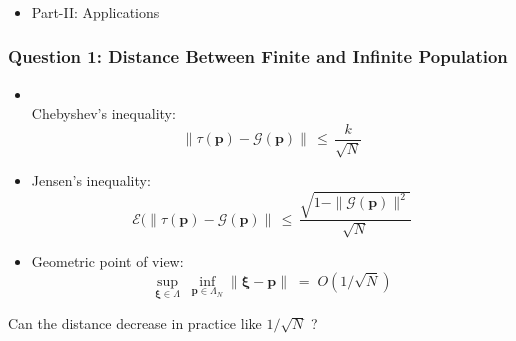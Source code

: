 \documentclass[aspectratio=169]{beamer}
\begin{document}
  \begin{frame}
    \frametitle{}
    \begin{itemize}
      \item Part-II: Applications
      \end{itemize}
  \end{frame}
  
   \begin{frame}
    \frametitle{Question 1: Distance Between Finite and Infinite Population}
    \begin{itemize}
      \item{\mbox{}\\[-0.5 in] 
      Chebyshev's inequality: \[ \| \tau (\bm{p}) - \mathcal{G}(\bm{p}) \| \,\leq\, \frac{k}{\sqrt{N}} \] }
      \item{Jensen's inequality: 
       \[ \mathcal{E}(\| \tau (\bm{p}) - \mathcal{G}(\bm{p}) \| \,\leq\, \frac{\sqrt{1 - \|\mathcal{G}(\bm{p})\|^2}}{\sqrt{N}}\]}
      \item{Geometric point of view: \[ \sup_{\bm{\xi} \in \Lambda} \; \inf_{\bm{p} \in \Lambda_N} \|\bm{\xi} - \bm{p}\| \;=\; O(1/\sqrt{N}) \] 	
      }      
    \end{itemize}
    Can the distance decrease in practice like $1/\sqrt{N}$ ?
  \end{frame}
  
\end{document}
